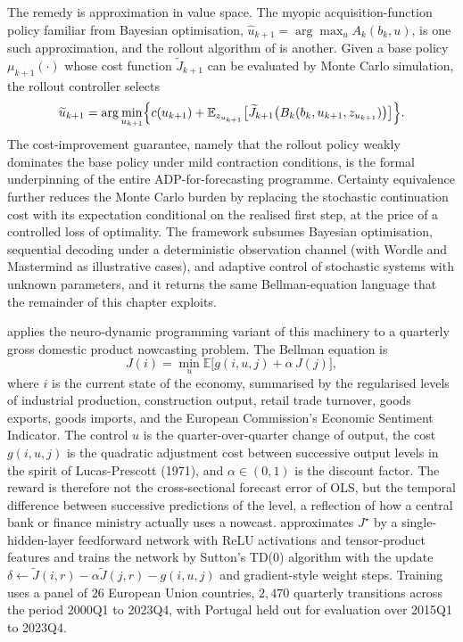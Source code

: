 The remedy is approximation in value space. The myopic acquisition-function policy
familiar from Bayesian optimisation, $\hat u_{k+1} = \arg\max_u A_k(b_k, u)$, is
one such approximation, and the rollout algorithm of \citet{BertsekasRollout2022}
is another. Given a base policy $\mu_{k+1}(\cdot)$ whose cost function
$\widetilde J_{k+1}$ can be evaluated by Monte Carlo simulation, the rollout
controller selects
\begin{equation}
\widetilde u_{k+1} = \arg\min_{u_{k+1}} \Bigl\{
  c(u_{k+1}) + \mathbb E_{z_{u_{k+1}}}\bigl[
    \widetilde J_{k+1}\bigl(B_k(b_k, u_{k+1}, z_{u_{k+1}})\bigr)
  \bigr] \Bigr\}.
\label{eq:rollout_update}
\end{equation}
The cost-improvement guarantee, namely that the rollout policy weakly dominates
the base policy under mild contraction conditions, is the formal underpinning of
the entire ADP-for-forecasting programme. Certainty equivalence further reduces
the Monte Carlo burden by replacing the stochastic continuation cost with its
expectation conditional on the realised first step, at the price of a controlled
loss of optimality. The framework subsumes Bayesian optimisation, sequential
decoding under a deterministic observation channel (with Wordle and Mastermind as
illustrative cases), and adaptive control of stochastic systems with unknown
parameters, and it returns the same Bellman-equation language that the remainder
of this chapter exploits.

\citet{Fernandes2024} applies the neuro-dynamic programming variant of this
machinery to a quarterly gross domestic product nowcasting problem. The Bellman
equation is
\begin{equation}
J(i) = \min_u \mathbb E\bigl[ g(i, u, j) + \alpha\, J(j) \bigr],
\label{eq:fernandes_bellman}
\end{equation}
where $i$ is the current state of the economy, summarised by the regularised
levels of industrial production, construction output, retail trade turnover,
goods exports, goods imports, and the European Commission's Economic Sentiment
Indicator. The control $u$ is the quarter-over-quarter change of output, the cost
$g(i, u, j)$ is the quadratic adjustment cost between successive output levels in
the spirit of Lucas-Prescott (1971), and $\alpha \in (0, 1)$ is the discount
factor. The reward is therefore not the cross-sectional forecast error of OLS,
but the temporal difference between successive predictions of the level, a
reflection of how a central bank or finance ministry actually uses a nowcast.
\citet{Fernandes2024} approximates $J^\star$ by a single-hidden-layer feedforward
network with ReLU activations and tensor-product features and trains the network
by Sutton's TD(0) algorithm with the update
$\delta \leftarrow \widetilde J(i, r) - \alpha \widetilde J(j, r) - g(i, u, j)$
and gradient-style weight steps. Training uses a panel of $26$ European Union
countries, $2{,}470$ quarterly transitions across the period 2000Q1 to 2023Q4,
with Portugal held out for evaluation over 2015Q1 to 2023Q4.

